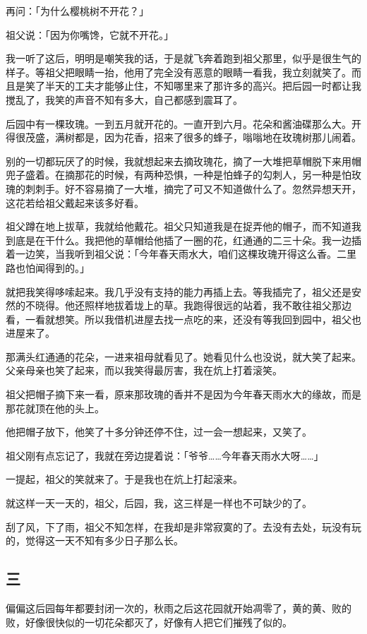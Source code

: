 \documentclass[UTF8]{ctexart}
\begin{document}
再问：「为什么樱桃树不开花？」

祖父说：「因为你嘴馋，它就不开花。」

我一听了这后，明明是嘲笑我的话，于是就飞奔着跑到祖父那里，似乎是很生气的样子。等祖父把眼睛一抬，他用了完全没有恶意的眼睛一看我，我立刻就笑了。而且是笑了半天的工夫才能够止住，不知哪里来了那许多的高兴。把后园一时都让我搅乱了，我笑的声音不知有多大，自己都感到震耳了。

后园中有一棵玫瑰。一到五月就开花的。一直开到六月。花朵和酱油碟那么大。开得很茂盛，满树都是，因为花香，招来了很多的蜂子，嗡嗡地在玫瑰树那儿闹着。

别的一切都玩厌了的时候，我就想起来去摘玫瑰花，摘了一大堆把草帽脱下来用帽兜子盛着。在摘那花的时候，有两种恐惧，一种是怕蜂子的勾刺人，另一种是怕玫瑰的刺刺手。好不容易摘了一大堆，摘完了可又不知道做什么了。忽然异想天开，这花若给祖父戴起来该多好看。

祖父蹲在地上拔草，我就给他戴花。祖父只知道我是在捉弄他的帽子，而不知道我到底是在干什么。我把他的草帽给他插了一圈的花，红通通的二三十朵。我一边插着一边笑，当我听到祖父说：「今年春天雨水大，咱们这棵玫瑰开得这么香。二里路也怕闻得到的。」

就把我笑得哆嗦起来。我几乎没有支持的能力再插上去。等我插完了，祖父还是安然的不晓得。他还照样地拔着垅上的草。我跑得很远的站着，我不敢往祖父那边看，一看就想笑。所以我借机进屋去找一点吃的来，还没有等我回到园中，祖父也进屋来了。

那满头红通通的花朵，一进来祖母就看见了。她看见什么也没说，就大笑了起来。父亲母亲也笑了起来，而以我笑得最厉害，我在炕上打着滚笑。

祖父把帽子摘下来一看，原来那玫瑰的香并不是因为今年春天雨水大的缘故，而是那花就顶在他的头上。

他把帽子放下，他笑了十多分钟还停不住，过一会一想起来，又笑了。

祖父刚有点忘记了，我就在旁边提着说：「爷爷……今年春天雨水大呀……」

一提起，祖父的笑就来了。于是我也在炕上打起滚来。

就这样一天一天的，祖父，后园，我，这三样是一样也不可缺少的了。

刮了风，下了雨，祖父不知怎样，在我却是非常寂寞的了。去没有去处，玩没有玩的，觉得这一天{不知有多少日子那么长}。

\subsection{三}

偏偏这后园每年都要封闭一次的，秋雨之后这花园就开始凋零了，黄的黄、败的败，好像很快似的一切花朵都灭了，好像有人把它们摧残了似的。
\end{document}
